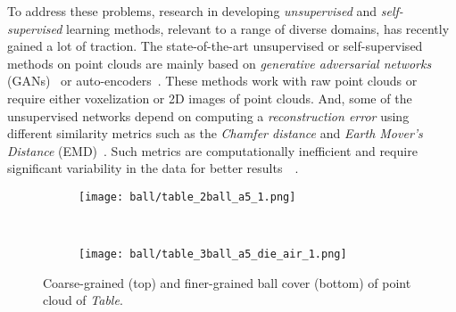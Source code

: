 \documentclass{article}
\begin{document}
To address these problems, research in developing \emph{unsupervised} and \emph{self-supervised} learning methods, relevant to a range of diverse domains, has recently gained a lot of traction. The state-of-the-art unsupervised or self-supervised methods on point clouds are mainly based on \emph{generative adversarial networks} (GANs)~\cite{wu2016learning,achlioptas2018learning,han2019view} or auto-encoders~\cite{yang2018foldingnet,zhao20193d,insafutdinov2018unsupervised,sharma2016vconv}. These methods work with raw point clouds or require either voxelization or 2D images of point clouds. 
And, some of the unsupervised networks depend on computing a \emph{reconstruction error} using different similarity metrics such as the \emph{Chamfer distance} and \emph{Earth Mover's Distance} (EMD)~\cite{yang2018foldingnet}.
Such metrics are computationally inefficient and require significant variability in the data for better results~\cite{achlioptas2018learning}~\cite{yang2018foldingnet}.
\begin{wrapfigure}{r}{0.33\linewidth}
	\centering
    \begin{subfigure}{.33\textwidth}
		\centering
		\texttt{[image: ball/table\_2ball\_a5\_1.png]}
\label{fig:ball5}
    \end{subfigure}\\
    \vspace{1mm}
    \begin{subfigure}{.33\textwidth}
		\centering
		\texttt{[image: ball/table\_3ball\_a5\_die\_air\_1.png]}
\label{fig:ball6}
	\end{subfigure}\caption{Coarse-grained (top) and finer-grained ball cover (bottom) of point cloud of \emph{Table}.}
	\vskip -0.15in
	\label{fig:balls2}
\end{wrapfigure}
\end{document}
